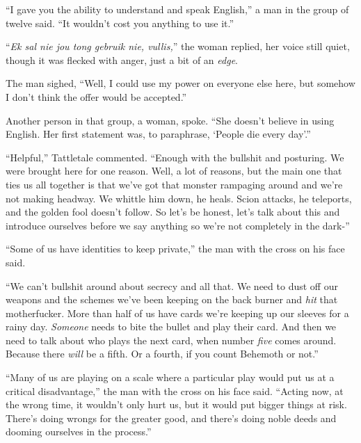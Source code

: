 ``I gave you the ability to understand and speak English,'' a man in the group of twelve said.  ``It wouldn't cost you anything to use it.''



``\emph{Ek sal nie jou tong gebruik nie, vullis,}'' the woman replied, her voice still quiet, though it was flecked with anger, just a bit of an \emph{edge}.



The man sighed, ``Well, I could use my power on everyone else here, but somehow I don't think the offer would be accepted.''



Another person in that group, a woman, spoke.  ``She doesn't believe in using English.  Her first statement was, to paraphrase, `People die every day'.''



``Helpful,'' Tattletale commented.  ``Enough with the bullshit and posturing.  We were brought here for one reason.  Well, a lot of reasons, but the main one that ties us all together is that we've got that monster rampaging around and we're not making headway.  We whittle him down, he heals.  Scion attacks, he teleports, and the golden fool doesn't follow.  So let's be honest, let's talk about this and introduce ourselves before we say anything so we're not completely in the dark-''



``Some of us have identities to keep private,'' the man with the cross on his face said.



``We can't bullshit around about secrecy and all that.  We need to dust off our weapons and the schemes we've been keeping on the back burner and \emph{hit} that motherfucker.  More than half of us have cards we're keeping up our sleeves for a rainy day.  \emph{Someone }needs to bite the bullet and play their card.  And then we need to talk about who plays the next card, when number \emph{five} comes around.  Because there \emph{will} be a fifth.  Or a fourth, if you count Behemoth or not.''



``Many of us are playing on a scale where a particular play would put us at a critical disadvantage,'' the man with the cross on his face said.  ``Acting now, at the wrong time, it wouldn't only hurt us, but it would put bigger things at risk.  There's doing wrongs for the greater good, and there's doing noble deeds and dooming ourselves in the process.''



